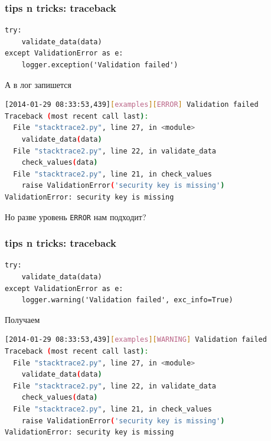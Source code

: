 \documentclass[aspectratio=169]{beamer}
\begin{document}
\begin{frame}[fragile]
  \frametitle{tips n tricks: traceback}

  \begin{lstlisting}
try:
    validate_data(data)
except ValidationError as e:
    logger.exception('Validation failed')
  \end{lstlisting}

А в лог запишется
  \begin{lstlisting}[language=sh]
[2014-01-29 08:33:53,439][examples][ERROR] Validation failed
Traceback (most recent call last):
  File "stacktrace2.py", line 27, in <module>
    validate_data(data)
  File "stacktrace2.py", line 22, in validate_data
    check_values(data)
  File "stacktrace2.py", line 21, in check_values
    raise ValidationError('security key is missing')
ValidationError: security key is missing
  \end{lstlisting}

\pause

{\color{WGred}
  Но разве уровень {\tt ERROR} нам подходит?
}
\end{frame}


\begin{frame}[fragile]
  \frametitle{tips n tricks: traceback}

  \begin{lstlisting}
try:
    validate_data(data)
except ValidationError as e:
    logger.warning('Validation failed', exc_info=True)
  \end{lstlisting}

Получаем
  \begin{lstlisting}[language=sh]
[2014-01-29 08:33:53,439][examples][WARNING] Validation failed
Traceback (most recent call last):
  File "stacktrace2.py", line 27, in <module>
    validate_data(data)
  File "stacktrace2.py", line 22, in validate_data
    check_values(data)
  File "stacktrace2.py", line 21, in check_values
    raise ValidationError('security key is missing')
ValidationError: security key is missing
  \end{lstlisting}

\end{frame}
\end{document}
